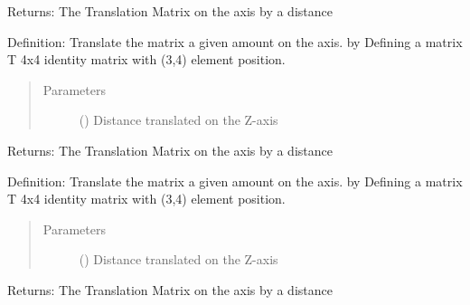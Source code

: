 \documentclass[letterpaper,10pt,english]{sphinxmanual}
\begin{document}
\begin{fulllineitems}
\begin{fulllineitems}
\begin{quote}
\begin{description}
\end{description}\end{quote}

Returns: The Translation Matrix on the  axis by a distance 

\end{fulllineitems}


\begin{fulllineitems}
\label{\detokenize{rst/MatrixManipulation:MatrixManipulation.Matrix.trans_y}}
Definition: Translate the matrix a given amount  on the  axis. by Defining a matrix T 4x4 identity
matrix with  (3,4) element position.
\begin{quote}\begin{description}
\item[{Parameters}] \leavevmode
{} () \textendash{} Distance translated on the Z-axis

\end{description}\end{quote}

Returns: The Translation Matrix on the  axis by a distance 

\end{fulllineitems}


\begin{fulllineitems}
\label{\detokenize{rst/MatrixManipulation:MatrixManipulation.Matrix.trans_z}}
Definition: Translate the matrix a given amount  on the  axis. by Defining a matrix T 4x4 identity
matrix with  (3,4) element position.
\begin{quote}\begin{description}
\item[{Parameters}] \leavevmode
{} () \textendash{} Distance translated on the Z-axis

\end{description}\end{quote}

Returns: The Translation Matrix on the  axis by a distance 

\end{fulllineitems}


\end{fulllineitems}
\end{document}
